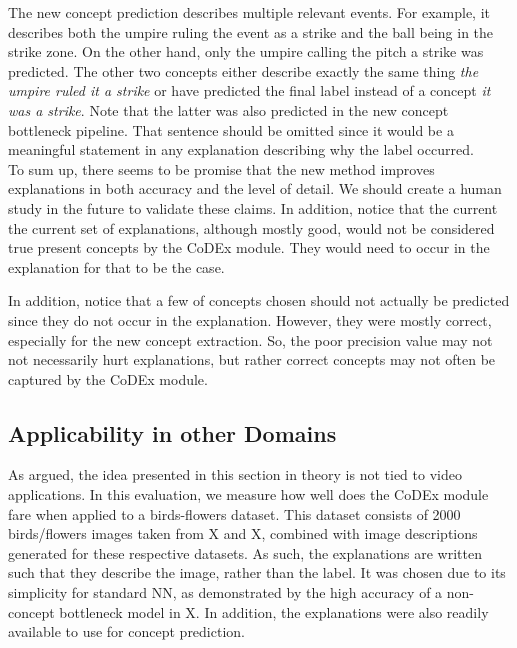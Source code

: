 The new concept prediction describes multiple relevant events. 
For example, it describes both the umpire ruling the event as a strike and the ball being in the strike zone.
On the other hand, only the umpire calling the pitch a strike was predicted. 
The other two concepts either describe exactly the same thing \emph{the umpire ruled it a strike} or have predicted the final label instead of a concept \emph{it was a strike}.
Note that the latter was also predicted in the new concept bottleneck pipeline. 
That sentence should be omitted since it would be a meaningful statement in any explanation describing why the label occurred. \\

To sum up, there seems to be promise that the new method improves explanations in both accuracy and the level of detail.
We should create a human study in the future to validate these claims.
In addition, notice that the current the current set of explanations, although mostly good, would not be considered true present concepts by the CoDEx module.
They would need to occur in the explanation for that to be the case.

In addition, notice that a few of concepts chosen should not actually be predicted since they do not occur in the explanation.
However, they were mostly correct, especially for the new concept extraction.
So, the poor precision value may not not necessarily hurt explanations, but rather correct concepts may not often be captured by the CoDEx module.

\subsection{Applicability in other Domains}
\label{applicability-in-other-domains}


As argued, the idea presented in this section in theory is not tied to video applications.
In this evaluation, we measure how well does the CoDEx module fare when applied to a birds-flowers dataset.
This dataset consists of 2000 birds/flowers images taken from X and X, combined with image descriptions generated for these respective datasets.
As such, the explanations are written such that they describe the image, rather than the label.
It was chosen due to its simplicity for standard NN, as demonstrated by the high accuracy of a non-concept bottleneck model in X.
In addition, the explanations were also readily available to use for concept prediction.

